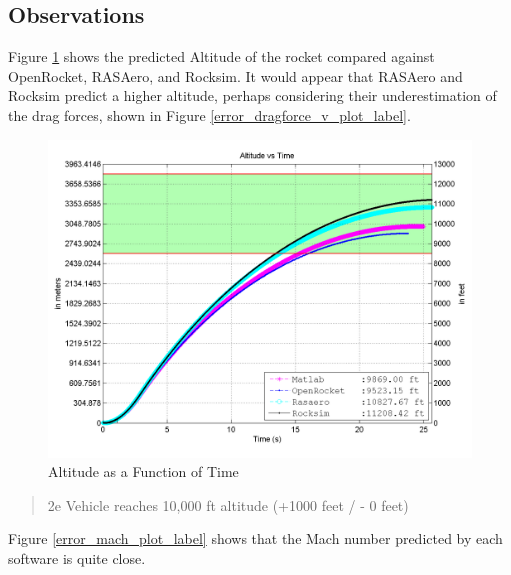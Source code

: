 \documentclass[]{article}
\begin{document}
\clearpage

\subsection{Observations}\label{observations}

Figure \ref{error_altitude_plot_label} shows the predicted Altitude of
the rocket compared against OpenRocket, RASAero, and Rocksim. It would
appear that RASAero and Rocksim predict a higher altitude, perhaps
considering their underestimation of the drag forces, shown in Figure
\ref{error_dragforce_v_plot_label}.

\begin{figure}[htbp]
\centering
\includegraphics{images/plots/error_altitude_plot.png}
\caption{Altitude as a Function of Time
\label{error_altitude_plot_label}}
\end{figure}

\begin{quote}
2e Vehicle reaches 10,000 ft altitude (+1000 feet / - 0 feet)
\end{quote}

\clearpage

Figure \ref{error_mach_plot_label} shows that the Mach number predicted
by each software is quite close.
\end{document}
